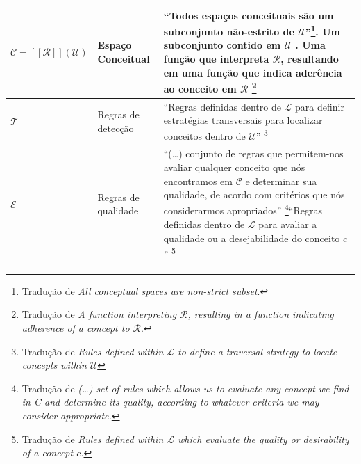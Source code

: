 \begin{table}[!h]
\begin{tabular}{ | p{4cm} | p{5.5cm} | p{5.5cm} |}
     $\mathcal{C} = [[\mathcal{R}]](\mathcal{U}) $
    & \tiny{Espaço Conceitual} 
    & \tiny{``Todos espaços conceituais são um subconjunto não-estrito de $\mathcal{U}$''\footnote{Tradução de \emph{All conceptual spaces are non-strict subset}.}. Um subconjunto contido em $\mathcal{U}$ \cite{wiggins_framework_2006}. Uma função que interpreta $\mathcal{R}$, resultando em uma função que indica aderência ao conceito em $\mathcal{R}$ \footnote{Tradução de \emph{A function interpreting $\mathcal{R}$, resulting in a function indicating adherence of a concept to $\mathcal{R}$}.} } \\
    \hline

    $\mathcal{T}$
    & \tiny{Regras de detecção} 
    & \tiny{``Regras definidas dentro de $\mathcal{L}$ para definir estratégias transversais para localizar conceitos dentro de $\mathcal{U}$'' \cite{mclean_music_2006}\footnote{Tradução de \emph{Rules defined within $\mathcal{L}$ to define a traversal strategy to locate concepts within $\mathcal{U}$ }}} \\
    \hline

    $\mathcal{E}$
    & \tiny{Regras de qualidade} 
    & \tiny{``(\ldots) conjunto de regras que permitem-nos avaliar qualquer conceito que nós encontramos em $\mathcal{C}$ e determinar sua qualidade, de acordo com critérios que nós considerarmos apropriados'' \cite[p.453]{wiggins_framework_2006}\footnote{Tradução de \emph{(\ldots) set of rules which allows us to evaluate any concept we find in C and determine its quality, according to whatever criteria we may consider appropriate.}}``Regras definidas dentro de $\mathcal{L}$ para avaliar a qualidade ou a desejabilidade do conceito $c$'' \cite{mclean_music_2006}\footnote{Tradução de \emph{Rules defined within $\mathcal{L}$ which evaluate the quality or desirability of a concept $c$.}}}\\
    \hline


\end{tabular}
\end{table}
